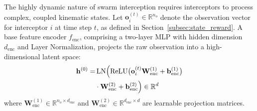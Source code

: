 \documentclass[lettersize,journal]{IEEEtran}
\begin{document}
The highly dynamic nature of swarm interception requires interceptors to process complex, coupled kinematic states. Let $\mathbf{o}_i^{(t)} \in \mathbb{R}^{n_o}$ denote the observation vector for interceptor $i$ at time step $t$, as defined in Section~\ref{subsec:state_reward}. A base feature encoder $f_{\mathrm{enc}}$, comprising a two-layer MLP with hidden dimension $d_{\mathrm{enc}}$ and Layer Normalization, projects the raw observation into a high-dimensional latent space:
\begin{equation}
\label{eq:encoder}
\begin{split}
\mathbf{h}^{(0)} =& \operatorname{LN}\Bigl(\operatorname{ReLU}\bigl(\mathbf{o}_i^{(t)}\mathbf{W}_{\mathrm{enc}}^{(1)} + \mathbf{b}_{\mathrm{enc}}^{(1)}\bigr) \\
&\cdot \mathbf{W}_{\mathrm{enc}}^{(2)} + \mathbf{b}_{\mathrm{enc}}^{(2)}\Bigr) \in \mathbb{R}^{d}
\end{split}
\end{equation}
where $\mathbf{W}_{\mathrm{enc}}^{(1)} \in \mathbb{R}^{n_o \times d_{\mathrm{enc}}}$ and $\mathbf{W}_{\mathrm{enc}}^{(2)} \in \mathbb{R}^{d_{\mathrm{enc}} \times d}$ are learnable projection matrices.
\end{document}
